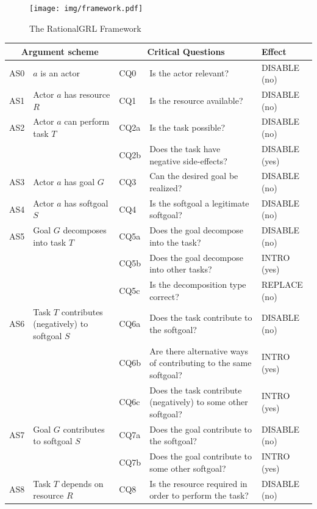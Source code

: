 \begin{figure}[t]
\centering
\texttt{[image: img/framework.pdf]}
\caption{The RationalGRL Framework}
\label{fig:rationalgrl-framework}
\end{figure}

\begin{table}[t]
\centering
\begin{tabularx}{\textwidth}{|l|l|l|X|l|}
\hline
\multicolumn{2}{|c|}{\textbf{Argument scheme}} & \multicolumn{2}{c|}{\textbf{Critical Questions}} & \textbf{Effect}\\
\hline
AS0 & $a$ is an actor & CQ0 & Is the actor relevant? & \textsf{DISABLE} (no)\\
\hline
AS1 & Actor $a$ has resource $R$ & CQ1 &Is the resource available? & \textsf{DISABLE} (no)\\
\hline
AS2 & Actor $a$ can perform task $T$ & CQ2a &Is the task possible? & \textsf{DISABLE} (no)\\
&& CQ2b & Does the task have negative side-effects? & \textsf{DISABLE} (yes)\\
\hline
AS3 & Actor $a$ has goal $G$ & CQ3 & Can the desired goal be realized? & \textsf{DISABLE} (no)\\
\hline
AS4 & Actor $a$ has softgoal $S$ & CQ4 & Is the softgoal a legitimate softgoal?& \textsf{DISABLE} (no)\\
\hline
\hline
AS5 & Goal $G$ decomposes into task $T$ & CQ5a & Does the goal decompose into the task?& \textsf{DISABLE} (no)\\
& & CQ5b & Does the goal decompose into other tasks? & \textsf{INTRO} (yes)\\
 &  & CQ5c & Is the decomposition type correct? & \textsf{REPLACE} (no)\\
\hline
AS6 & Task $T$ contributes (negatively) to softgoal $S$& CQ6a & Does the task contribute to the softgoal?& \textsf{DISABLE} (no)\\
&& CQ6b & Are there alternative ways of contributing to the same softgoal?& \textsf{INTRO} (yes) \\
&& CQ6c & Does the task contribute (negatively) to some other softgoal?& \textsf{INTRO} (yes)\\
\hline
AS7 & Goal $G$ contributes to softgoal $S$ & CQ7a & Does the goal contribute to the softgoal?& \textsf{DISABLE} (no)\\
&& CQ7b & Does the goal contribute to some other softgoal?& \textsf{INTRO} (yes)\\
\hline
AS8 & Task $T$ depends on resource $R$ & CQ8 & Is the resource required in order to perform the task?& \textsf{DISABLE} (no)\\

\end{tabularx}
\end{table}
